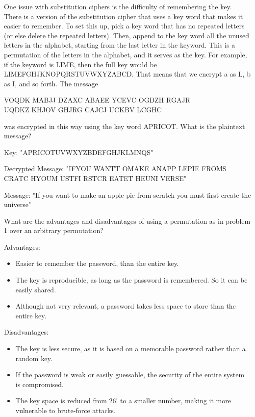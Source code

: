 \documentclass{my-cls}
\begin{document}
\begin{problem}[2.1]
One issue with substitution ciphers is the difficulty of remembering the key. There is a version of the substitution cipher that uses a key word that makes it easier to remember. To set this up, pick a key word that has no repeated letters (or else delete the repeated letters). Then, append to the key word all the unused letters in the alphabet, starting from the last letter in the keyword. This is a permutation of the letters in the alphabet, and it serves as the key. For example, if the keyword is LIME, then the full key would be LIMEFGHJKNOPQRSTUVWXYZABCD. That means that we encrypt a as L, b as I, and so forth. The message

\smallskip

VOQDK MABJJ DZAXC ABAEE YCEVC OGDZH RGAJR \\
UQDKZ KHJOV GHJRG CAJCJ UCKBV LCGHC

\smallskip

was encrypted in this way using the key word APRICOT. What is the plaintext message?
\end{problem}

\begin{solution}[2.1]
Key: "APRICOTUVWXYZBDEFGHJKLMNQS"

\smallskip

Decrypted Message: "IFYOU WANTT OMAKE ANAPP LEPIE FROMS CRATC HYOUM USTFI RSTCR EATET HEUNI VERSE"

\smallskip

Message: "If you want to make an apple pie from scratch you must first create the universe"
\end{solution}

\begin{problem}[2.2]
What are the advantages and disadvantages of using a permutation as in problem 1 over an arbitrary permutation?
\end{problem}

\begin{solution}[2.2]
Advantages:
\begin{itemize}
    \item Easier to remember the password, than the entire key.
    \item The key is reproducible, as long as the password is remembered. So it can be easily shared.
    \item Although not very relevant, a password takes less space to store than the entire key.
\end{itemize}
Disadvantages:
\begin{itemize}
    \item The key is less secure, as it is based on a memorable password rather than a random key.
    \item If the password is weak or easily guessable, the security of the entire system is compromised.
    \item The key space is reduced from \(26!\) to a smaller number, making it more vulnerable to brute-force attacks.
\end{itemize}
\end{solution}
\end{document}
